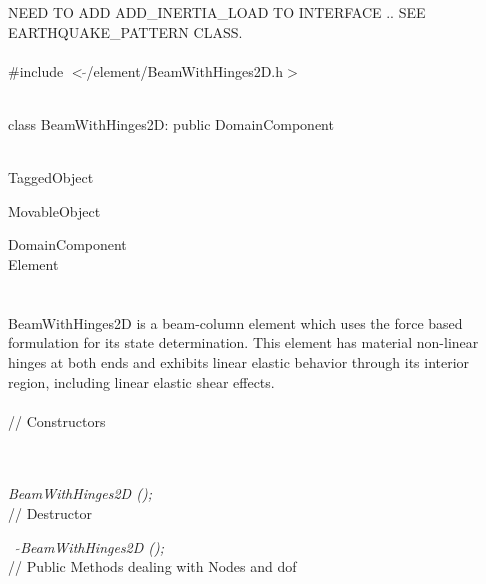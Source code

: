 
NEED TO ADD ADD\_INERTIA\_LOAD TO INTERFACE .. SEE EARTHQUAKE\_PATTERN
CLASS.\\

   \\
\#include $<\tilde{ }$/element/BeamWithHinges2D.h$>$  


  \\
class BeamWithHinges2D: public DomainComponent 


 \\
TaggedObject 

MovableObject 

\indent\indent DomainComponent \\
\indent\indent\indent Element \\
\indent\indent\indent{} \\

  \\
\indent BeamWithHinges2D is a beam-column element which uses the force
based formulation for its state determination.  This element has
material non-linear hinges at both ends and exhibits linear elastic
behavior through its interior region, including linear elastic shear
effects. \\

 \\
// Constructors 

  \\
  \\
{\em BeamWithHinges2D ();} \\ 

// Destructor 

{\em ~ $\tilde{}$BeamWithHinges2D ();}\\ 

// Public Methods dealing with Nodes and dof

